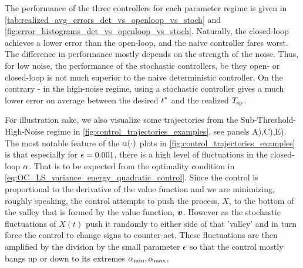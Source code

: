 \documentclass[12pt]{iopart}
\begin{document}
The performance of the three controllers for each parameter regime is given in
\cref{tab:realized_avg_errors_det_vs_openloop_vs_stoch} and
\cref{fig:error_histograms_det_vs_openloop_vs_stoch}. Naturally, the closed-loop
achieves a lower error than the open-loop, and the naive controller fares worst.
The difference in performance mostly depends on the strength of the noise. Thus,
for low noise, the performance of the stochastic controllers, be they open- or
closed-loop is not much superior to the naive deterministic controller. On the
contrary - in the high-noise regime, using a stochastic controller gives a much
lower error on average between the desired ${ t^* }$ and the realized ${ T_{\textrm{sp} } }$.

For illustration sake, we also visualize some trajectories from the
Sub-Threshold-High-Noise regime in \cref{fig:control_trajectories_examples}, see
panels A),C),E). The most notable feature of the ${\alpha}(\cdot)$ plots in
\cref{fig:control_trajectories_examples} is that especially for ${\epsilon}=0.001$,
there is a high level of fluctuations in the closed-loop ${\alpha}$. That is to be
expected from the optimality condition in
\cref{eq:OC_LS_variance_energy_quadratic_control}. Since the control is
proportional to the derivative of the value function and we are minimizing,
roughly speaking, the control attempts to push the process, $X$, to the bottom
of the valley that is formed by the value function, ${ \boldsymbol{v} }$. However as the
stochastic fluctuations of $X(t)$ push it randomly to either side of that
'valley' and in turn force the control to change signs to counter-act.
These fluctuations are then amplified by the division by the small parameter
${\epsilon}$ so that the control mostly bangs up or down to its extremes
${ {\alpha}_{\textrm{min}} }, { {\alpha}_{\textrm{max}} }$.
 
\end{document}
